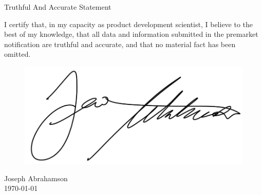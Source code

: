 \newpage
{}
\singlespacing
\begin{center}
  \large{Truthful And Accurate Statement}
\end{center}

\onehalfspacing

I certify that, in my capacity as product development scientist, I
believe to the best of my knowledge, that all data and information
submitted in the premarket notification are truthful and accurate, and
that no material fact has been omitted.

\begin{figure}[H]
  \includegraphics[width=0.35\linewidth]{imgs/ja-sig}
\end{figure}

\noindent Joseph Abrahamson \\
\today

